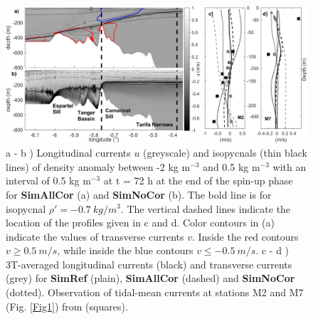 %
\begin{figure}
 \includegraphics[width=\textwidth]{./GBR2D/figure4.png}
 \caption {a - b ) Longitudinal currents $u$ (greyscale) and isopycnals (thin black lines) of density anomaly between -2 kg m$^{-3}$ and 0.5 kg m$^{-3}$ with an interval of 0.5 kg m$^{-3}$ at t = 72 h at the end of the spin-up phase for \textbf{SimAllCor} (a) and \textbf{SimNoCor} (b). The bold line is for isopycnal $\rho' = -0.7 \ kg/m^3$. The vertical dashed lines indicate the location of the profiles given in c and d. Color contours in (a) indicate the values of transverse currents $v$. Inside the red contours $v \geq 0.5 \ m/s$, while inside the blue contours $v \leq -0.5 \ m/s$.  
  c - d ) 3T-averaged longitudinal currents (black) and transverse currents (grey) for \textbf{SimRef} (plain), \textbf{SimAllCor} (dashed) and \textbf{SimNoCor} (dotted). Observation of tidal-mean currents at stations M2 and M7 (Fig. \ref{Fig1}) from \citet{CW90} (squares).}
  \label{fig2}
\end{figure}

